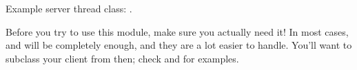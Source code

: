 Example server thread class: .

\begin{important}
Before you try to use this module, make sure you actually need it!
In most cases,  and  will be completely
enough, and they are a lot easier to handle. You'll want to subclass your
client from  then; check  and
 for examples.
\end{important}


